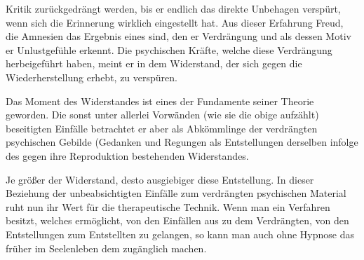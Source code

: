 \documentclass[twoside=true,titlepage=false,open=any, parskip=never, fontsize=10pt, headings=small, chapterprefix=false, appendixprefix=false]{scrbook}
\begin{document}
               Kritik zurückgedrängt werden, bis er endlich das direkte Unbehagen verspürt,
               wenn sich die Erinnerung wirklich eingestellt hat. Aus dieser Erfahrung
               Freud,  die Amnesien das Ergebnis eines  sind, den er Verdrängung
                und als dessen Motiv er Unlustgefühle erkennt. Die psychischen Kräfte,
               welche diese Verdrängung herbeigeführt haben, meint er in dem Widerstand, der sich gegen die Wiederherstellung erhebt, zu
                  verspüren.
        \pend
    


            
        \pstart
        Das Moment des Widerstandes ist eines der Fundamente seiner Theorie geworden.
               Die sonst unter allerlei Vorwänden (wie sie die obige  aufzählt) beseitigten Einfälle betrachtet er aber als Abkömmlinge der
               verdrängten psychischen Gebilde (Gedanken und Regungen als Entstellungen derselben infolge des gegen ihre Reproduktion
               bestehenden Widerstandes.
        \pend
    
            
        \pstart
        Je größer  der Widerstand, desto ausgiebiger diese Entstellung. In dieser Beziehung der unbeabsichtigten
               Einfälle zum verdrängten psychischen Material ruht nun ihr Wert für
               die therapeutische Technik. Wenn man ein Verfahren besitzt, welches ermöglicht,
               von den Einfällen aus zu dem Verdrängten, von den Entstellungen zum Entstellten
               zu gelangen, so kann man auch ohne Hypnose das früher  im Seelenleben dem
                zugänglich machen.
        \pend
    
\end{document}

